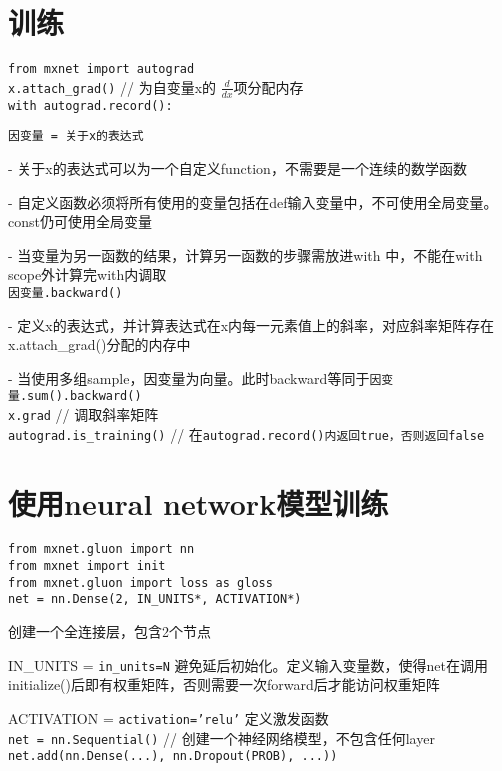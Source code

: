 \documentclass[UTF8]{ctexart}
\begin{document}
\section{训练}

\noindent \texttt{from mxnet import autograd}\\
\texttt{x.attach\_grad()} // 为自变量x的 $\frac{d }{d x} $项分配内存\\
\texttt{with autograd.record():}

  \texttt{因变量 = 关于x的表达式}
  
  - 关于x的表达式可以为一个自定义function，不需要是一个连续的数学函数
  
  - 自定义函数必须将所有使用的变量包括在def输入变量中，不可使用全局变量。const仍可使用全局变量
  
  - 当变量为另一函数的结果，计算另一函数的步骤需放进with 中，不能在with scope外计算完with内调取\\
\texttt{因变量.backward()}
  
  - 定义x的表达式，并计算表达式在x内每一元素值上的斜率，对应斜率矩阵存在x.attach\_grad()分配的内存中
  
  - 当使用多组sample，因变量为向量。此时backward等同于\texttt{因变量.sum().backward()}\\
\texttt{x.grad} // 调取斜率矩阵\\
\texttt{autograd.is\_training()} // 在\texttt{autograd.record()内返回true，否则返回false}

\section{使用neural network模型训练}

\noindent \texttt{from mxnet.gluon import nn}\\
\texttt{from mxnet import init}\\
\texttt{from mxnet.gluon import loss as gloss}\\
\texttt{net = nn.Dense(2, IN\_UNITS*, ACTIVATION*)}

  创建一个全连接层，包含2个节点

  IN\_UNITS = \texttt{in\_units=N} 避免延后初始化。定义输入变量数，使得net在调用initialize()后即有权重矩阵，否则需要一次forward后才能访问权重矩阵
  
  ACTIVATION = \texttt{activation='relu'} 定义激发函数\\
\texttt{net = nn.Sequential()} // 创建一个神经网络模型，不包含任何layer\\
\texttt{net.add(nn.Dense(...), nn.Dropout(PROB), ...))}
\end{document}
